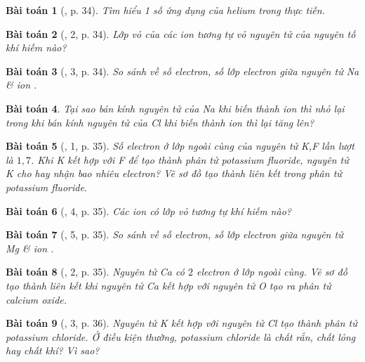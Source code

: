 \documentclass{article}
\newtheorem{baitoan}{Bài toán}
\begin{document}
\begin{baitoan}[\cite{SGK_KHTN_7_Canh_Dieu}, p. 34]
	Tìm hiểu 1 số ứng dụng của helium trong thực tiễn.
\end{baitoan}

\begin{baitoan}[\cite{SGK_KHTN_7_Canh_Dieu}, 2, p. 34]
	Lớp vỏ của các ion \emph{} tương tự vỏ nguyên tử của nguyên tố khí hiếm nào?
\end{baitoan}

\begin{baitoan}[\cite{SGK_KHTN_7_Canh_Dieu}, 3, p. 34]
	So sánh về số electron, số lớp electron giữa nguyên tử \emph{Na} \& ion \emph{}.
\end{baitoan}

\begin{baitoan}
	Tại sao bán kính nguyên tử của \emph{Na} khi biến thành ion \emph{} thì nhỏ lại trong khi bán kính nguyên tử của \emph{Cl} khi biến thành ion \emph{} thì lại tăng lên?
\end{baitoan}

\begin{baitoan}[\cite{SGK_KHTN_7_Canh_Dieu}, 1, p. 35]
	Số electron ở lớp ngoài cùng của nguyên tử \emph{K,F} lần lượt là $1,7$. Khi \emph{K} kết hợp với \emph{F} để tạo thành phân tử potassium fluoride, nguyên tử \emph{K} cho hay nhận bao nhiêu electron? Vẽ sơ đồ tạo thành liên kết trong phân tử potassium fluoride.
\end{baitoan}

\begin{baitoan}[\cite{SGK_KHTN_7_Canh_Dieu}, 4, p. 35]
	Các ion \emph{} có lớp vỏ tương tự khí hiếm nào?
\end{baitoan}

\begin{baitoan}[\cite{SGK_KHTN_7_Canh_Dieu}, 5, p. 35]
	So sánh về số electron, số lớp electron giữa nguyên tử \emph{Mg} \& ion \emph{}.
\end{baitoan}

\begin{baitoan}[\cite{SGK_KHTN_7_Canh_Dieu}, 2, p. 35]
	Nguyên tử \emph{Ca} có $2$ electron ở lớp ngoài cùng. Vẽ sơ đồ tạo thành liên kết khi nguyên tử \emph{Ca} kết hợp với nguyên tử \emph{O} tạo ra phân tử calcium oxide.
\end{baitoan}

\begin{baitoan}[\cite{SGK_KHTN_7_Canh_Dieu}, 3, p. 36]
	Nguyên tử \emph{K} kết hợp với nguyên tử \emph{Cl} tạo thành phân tử potassium chloride. Ở điều kiện thường, potassium chloride là chất rắn, chất lỏng hay chất khí? Vì sao?
\end{baitoan}
\end{document}
